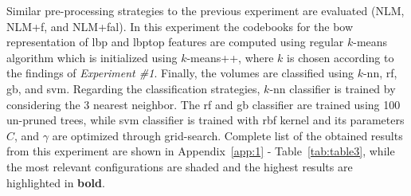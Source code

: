Similar pre-processing strategies to the previous experiment are evaluated (NLM, NLM+\acs{f}, and NLM+\acs{fal}).
In this experiment the codebooks for the \ac{bow} representation of \ac{lbp} and \ac{lbptop} features are computed using regular $k$-means algorithm which is initialized using $k$-means++, where $k$ is chosen according to the findings of \emph{Experiment \#1}.
Finally, the volumes are classified using $k$-\ac{nn}, \ac{rf}, \ac{gb}, and \ac{svm}.
Regarding the classification strategies, $k$-\ac{nn} classifier is trained by considering the 3 nearest neighbor.
The \ac{rf} and \ac{gb} classifier are trained using 100 un-pruned trees, while \ac{svm} classifier is trained with \ac{rbf} kernel and its parameters $C$, and $\gamma$ are optimized through grid-search.
Complete list of the obtained results from this experiment are shown in Appendix~\ref{app:1} - Table~\ref{tab:table3}, while the most relevant configurations are shaded and the highest results are highlighted in \textbf{bold}.

%

